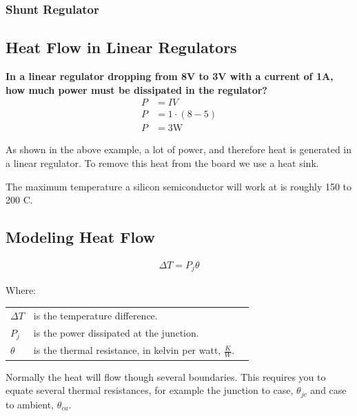 \subsubsection{Shunt Regulator}

\subsection{Heat Flow in Linear Regulators}

\begin{framed}
\textbf{In a linear regulator dropping from 8V to 3V with a current of 1A, how much power must be dissipated in the regulator?}
\begin{align*}
P &= IV \\
P &= 1\cdot(8-5) \\
P &= 3\textrm{W}
\end{align*}
\end{framed}

As shown in the above example, a lot of power, and therefore heat is generated in a linear regulator. To remove this heat from the board we use a heat sink.

The maximum temperature a silicon semiconductor will work at is roughly 150 to 200 \degree C.

\subsection{Modeling Heat Flow}

\begin{align*}
\Delta T = P_j \theta
\end{align*}

Where:

\begin{table}[H]
	\centering
    \begin{tabular}{lll}
    $\Delta T$ & is the temperature difference. \\
    $P_j$      & is the power dissipated at the junction. \\
    $\theta$   & is the thermal resistance, in kelvin per watt, $\frac{K}{W}$. \\
    \end{tabular}
\end{table}

Normally the heat will flow though several boundaries. This requires you to equate several thermal resistances, for example the junction to case, $\theta_{jc}$ and case to ambient, $\theta_{ca}$.

